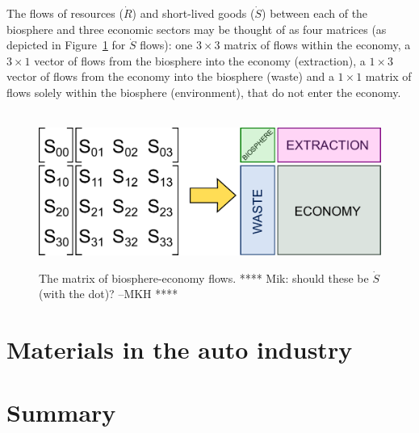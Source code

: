 The flows of resources ($\dot{R}$) and short-lived goods ($\dot{S}$) between each of the biosphere and three economic sectors may be thought of as four matrices (as depicted in Figure~\ref{fig:C_mat_matrix} for $\dot{S}$ flows): one $3\times3$ matrix of flows within the economy, a $3\times1$ vector of flows from the biosphere into the economy (extraction), a $1\times3$ vector of flows from the economy into the biosphere (waste) and a $1\times1$ matrix of flows solely within the biosphere (environment), that do not enter the economy.

\begin{figure}[!ht]
\centering\
\includegraphics[width=0.8\linewidth]{Part_1/Chapter_Materials/images/Matrix.pdf}
\caption[The matrix of biosphere\index{biosphere}-economy flows.]{The matrix of biosphere-economy flows. **** Mik: should these be $\dot{S}$ (with the dot)? --MKH ****}
\label{fig:C_mat_matrix}
\end{figure}

\section{Materials in the auto industry}
\label{sec:materials_auto}

\section{Summary}
\label{sec:materials_summary}






